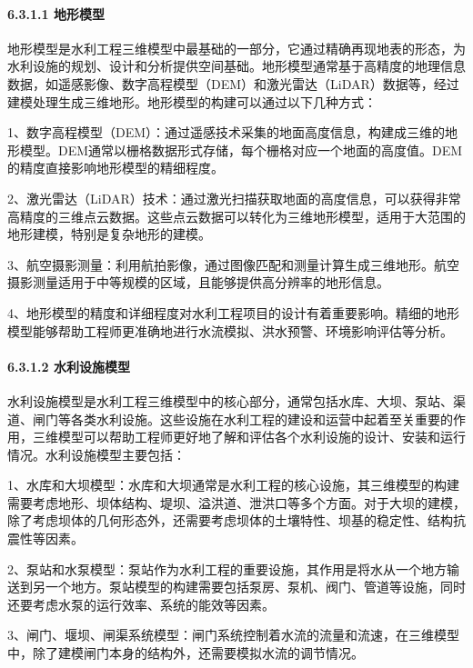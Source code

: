 \hypertarget{ux5730ux5f62ux6a21ux578b}{%
\paragraph{6.3.1.1 地形模型}\label{ux5730ux5f62ux6a21ux578b}}

地形模型是水利工程三维模型中最基础的一部分，它通过精确再现地表的形态，为水利设施的规划、设计和分析提供空间基础。地形模型通常基于高精度的地理信息数据，如遥感影像、数字高程模型（DEM）和激光雷达（LiDAR）数据等，经过建模处理生成三维地形。地形模型的构建可以通过以下几种方式：

1、数字高程模型（DEM）：通过遥感技术采集的地面高度信息，构建成三维的地形模型。DEM通常以栅格数据形式存储，每个栅格对应一个地面的高度值。DEM的精度直接影响地形模型的精细程度。

2、激光雷达（LiDAR）技术：通过激光扫描获取地面的高度信息，可以获得非常高精度的三维点云数据。这些点云数据可以转化为三维地形模型，适用于大范围的地形建模，特别是复杂地形的建模。

3、航空摄影测量：利用航拍影像，通过图像匹配和测量计算生成三维地形。航空摄影测量适用于中等规模的区域，且能够提供高分辨率的地形信息。

4、地形模型的精度和详细程度对水利工程项目的设计有着重要影响。精细的地形模型能够帮助工程师更准确地进行水流模拟、洪水预警、环境影响评估等分析。

\hypertarget{ux6c34ux5229ux8bbeux65bdux6a21ux578b}{%
\paragraph{6.3.1.2 水利设施模型}\label{ux6c34ux5229ux8bbeux65bdux6a21ux578b}}

水利设施模型是水利工程三维模型中的核心部分，通常包括水库、大坝、泵站、渠道、闸门等各类水利设施。这些设施在水利工程的建设和运营中起着至关重要的作用，三维模型可以帮助工程师更好地了解和评估各个水利设施的设计、安装和运行情况。水利设施模型主要包括：

1、水库和大坝模型：水库和大坝通常是水利工程的核心设施，其三维模型的构建需要考虑地形、坝体结构、堤坝、溢洪道、泄洪口等多个方面。对于大坝的建模，除了考虑坝体的几何形态外，还需要考虑坝体的土壤特性、坝基的稳定性、结构抗震性等因素。

2、泵站和水泵模型：泵站作为水利工程的重要设施，其作用是将水从一个地方输送到另一个地方。泵站模型的构建需要包括泵房、泵机、阀门、管道等设施，同时还要考虑水泵的运行效率、系统的能效等因素。

3、闸门、堰坝、闸渠系统模型：闸门系统控制着水流的流量和流速，在三维模型中，除了建模闸门本身的结构外，还需要模拟水流的调节情况。

